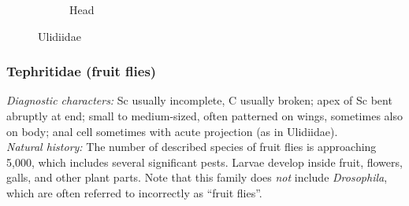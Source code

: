 \documentclass[letterpaper, 11pt]{article}
\begin{document}
\begin{figure}[ht!]
\begin{subfigure}[ht!]{0.26\textwidth}
        \caption{Head \citep[][Fig. 63.7]{mcalpine1981manualv2}}
        \label{fig:ulidiid2}
    \end{subfigure}
    \caption{Ulidiidae}\label{fig:ulidiids}
\end{figure}

\subsubsection{Tephritidae (fruit flies)}
\noindent{}\textit{Diagnostic characters:} Sc usually incomplete, C usually broken; apex of Sc bent abruptly at end; small to medium-sized, often patterned on wings, sometimes also on body; anal cell sometimes with acute projection (as in Ulidiidae).\\

\noindent{}\textit{Natural history:} The number of described species of fruit flies is approaching 5,000, which includes several significant pests. Larvae develop inside fruit, flowers, galls, and other plant parts. Note that this family does \textit{not} include \textit{Drosophila}, which are often referred to incorrectly as ``fruit flies''. 
\end{document}
